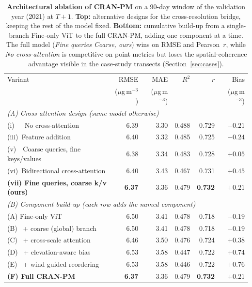 %

\begin{table}[!ht]
  \centering
  \small
  \caption{\textbf{Architectural ablation of CRAN-PM} on a 90-day window
  of the validation year (2021) at $T+1$. \textbf{Top:} alternative
  designs for the cross-resolution bridge, keeping the rest of the model
  fixed. \textbf{Bottom:} cumulative build-up from a single-branch
  Fine-only ViT to the full CRAN-PM, adding one component at a time.
  The full model (\textit{Fine queries Coarse, ours}) wins on RMSE and
  Pearson~$r$, while \textit{No cross-attention} is competitive on
  point metrics but loses the spatial-coherence advantage visible in
  the case-study transects (Section~\ref{sec:cases}).}
  \label{tab:ablation}
  \begin{tabular}{l r r r r r}
    \toprule
    Variant & RMSE & MAE & $R^2$ & $r$ & Bias \\
            & ($\mu$g\,m$^{-3}$) & ($\mu$g\,m$^{-3}$) & & & ($\mu$g\,m$^{-3}$) \\
    \midrule
    \multicolumn{6}{l}{\textit{(A) Cross-attention design (same model otherwise)}} \\[2pt]
    (i)~~~No cross-attention                       & 6.39 & 3.30 & 0.488 & 0.729 & $-0.21$ \\
    (iii)~Feature addition                         & 6.40 & 3.32 & 0.485 & 0.725 & $-0.24$ \\
    (v)~~Coarse queries, fine keys/values          & 6.38 & 3.34 & 0.483 & 0.728 & $+0.05$ \\
    (vi)~Bidirectional cross-attention             & 6.40 & 3.43 & 0.467 & 0.731 & $+0.45$ \\
    \textbf{(vii) Fine queries, coarse k/v (ours)} & \textbf{6.37} & 3.36 & 0.479 & \textbf{0.732} & $+0.21$ \\
    \midrule
    \multicolumn{6}{l}{\textit{(B) Component build-up (each row adds the named component)}} \\[2pt]
    (A) Fine-only ViT                              & 6.50 & 3.41 & 0.478 & 0.718 & $-0.19$ \\
    (B) ~+ coarse (global) branch                  & 6.50 & 3.41 & 0.478 & 0.718 & $-0.19$ \\
    (C) ~+ cross-scale attention                   & 6.46 & 3.50 & 0.476 & 0.724 & $+0.38$ \\
    (D) ~+ elevation-aware bias                    & 6.53 & 3.58 & 0.447 & 0.722 & $+0.74$ \\
    (E) ~+ wind-guided reordering                  & 6.53 & 3.58 & 0.446 & 0.722 & $+0.76$ \\
    \textbf{(F) Full CRAN-PM}                      & \textbf{6.37} & 3.36 & 0.479 & \textbf{0.732} & $+0.21$ \\
    \bottomrule
  \end{tabular}
\end{table}
